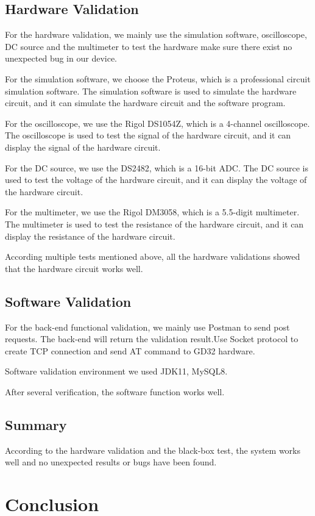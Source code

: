 \documentclass[11pt, a4paper]{article}
\begin{document}
\subsection{Hardware Validation}

For the hardware validation, we mainly use the simulation software, oscilloscope, DC source and the multimeter to test the hardware make sure there exist no unexpected bug in our device.

For the simulation software, we choose the Proteus, which is a professional circuit simulation software.
The simulation software is used to simulate the hardware circuit, and it can simulate the hardware circuit and the software program.

For the oscilloscope, we use the Rigol DS1054Z, which is a 4-channel oscilloscope.
The oscilloscope is used to test the signal of the hardware circuit, and it can display the signal of the hardware circuit.

For the DC source, we use the DS2482, which is a 16-bit ADC.
The DC source is used to test the voltage of the hardware circuit, and it can display the voltage of the hardware circuit.

For the multimeter, we use the Rigol DM3058, which is a 5.5-digit multimeter.
The multimeter is used to test the resistance of the hardware circuit, and it can display the resistance of the hardware circuit.

According multiple tests mentioned above, all the hardware validations showed that the hardware circuit works well.
\subsection{Software Validation}
For the back-end functional validation, we mainly use Postman to send post requests. The back-end will return the validation result.Use Socket protocol to create TCP connection and send AT command to GD32 hardware.

Software validation environment we used JDK11, MySQL8.

After several verification, the software function works well.

\subsection{Summary}
According to the hardware validation and the black-box test, the system works well and no unexpected results or bugs have been found.

\section{Conclusion}
\end{document}
